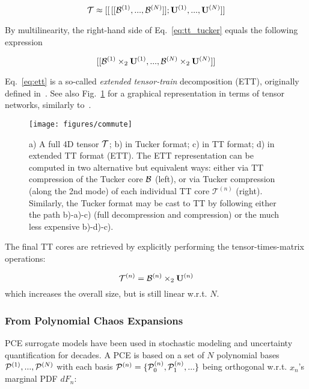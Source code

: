 \documentclass[review, twocolumn]{svjour3}          %
\begin{document}
\begin{equation}
\label{eq:tt_tucker}
\mathcal{T} \approx [[\,[[\mathcal{B}^{(1)}, ..., \mathcal{B}^{(N)}]]; \mathbf{U}^{(1)}, ..., \mathbf{U}^{(N)}]]
\end{equation}

By multilinearity, the right-hand side of Eq.~\ref{eq:tt_tucker} equals the following expression

\begin{equation}
\label{eq:ett}
[[\mathcal{B}^{(1)} \times_2 \mathbf{U}^{(1)}, ..., \mathcal{B}^{(N)} \times_2 \mathbf{U}^{(N)}]]
\end{equation}

Eq.~\ref{eq:ett} is a so-called \emph{extended tensor-train} decomposition (ETT), originally defined in~\cite{OT:10b}. See also Fig.~\ref{fig:commute} for a graphical representation in terms of tensor networks, similarly to~\cite{CLOPZM:16}.

\begin{figure}[ht]\centering
  \texttt{[image: figures/commute]}
  \caption{a) A full 4D tensor $\mathcal{T}$; b) in Tucker format; c) in TT format; d) in extended TT format (ETT). The ETT representation can be computed in two alternative but equivalent ways: either via TT compression of the Tucker core $\mathcal{B}$ (left), or via Tucker compression (along the 2nd mode) of each individual TT core $\mathcal{T}^{(n)}$ (right). Similarly, the Tucker format may be cast to TT by following either the path b)-a)-c) (full decompression and compression) or the much less expensive b)-d)-c).}
  \label{fig:commute}
\end{figure}

The final TT cores are retrieved by explicitly performing the tensor-times-matrix operations:

\begin{equation}
\mathcal{T}^{(n)} = \mathcal{B}^{(n)} \times_2 \mathbf{U}^{(n)}
\end{equation}
%
which increases the overall size, but is still linear w.r.t. $N$.

\subsubsection{From Polynomial Chaos Expansions} \label{sec:from_pce}


PCE surrogate models have been used in stochastic modeling and uncertainty quantification for decades. A PCE is based on a set of $N$ polynomial bases $\mathcal{P}^{(1)}, ..., \mathcal{P}^{(N)}$ with each basis $\mathcal{P}^{(n)} = \{\mathcal{P}^{(n)}_0, \mathcal{P}^{(n)}_1, ... \}$ being orthogonal w.r.t. $x_n$'s marginal PDF $dF_{n}$:
\end{document}
